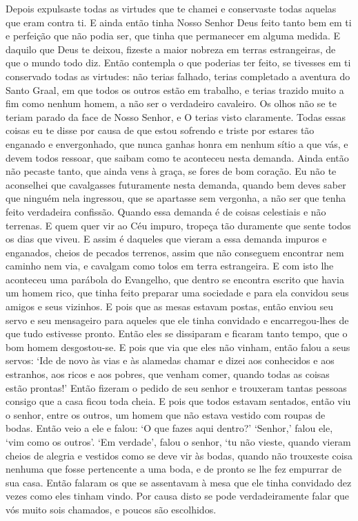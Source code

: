 Depois expulsaste todas as virtudes que te chamei e conservaste todas
aquelas que eram contra ti. E ainda então tinha Nosso Senhor Deus feito tanto
bem em ti e perfeição que não podia ser, que tinha que permanecer em alguma
medida. E daquilo que Deus te deixou, fizeste a maior nobreza em terras
estrangeiras, de que o mundo todo diz. Então contempla o que poderias ter
feito, se tivesses em ti conservado todas as virtudes: não terias falhado,
terias completado a aventura do Santo Graal, em que todos os outros estão em
trabalho, e terias trazido muito a fim como nenhum homem, a não ser o
verdadeiro cavaleiro. Os olhos não se te teriam parado da face de Nosso Senhor,
e O terias visto claramente. Todas essas coisas eu te disse por causa de que
estou sofrendo e triste por estares tão enganado e envergonhado, que nunca
ganhas honra em nenhum sítio a que vás, e devem todos ressoar, que saibam como
te aconteceu nesta demanda. Ainda então não pecaste tanto, que ainda vens à
graça, se fores de bom coração. Eu não te aconselhei que cavalgasses
futuramente nesta demanda, quando bem deves saber que ninguém nela ingressou,
que se apartasse sem vergonha, a não ser que tenha feito verdadeira confissão.
Quando essa demanda é de coisas celestiais e não terrenas. E quem quer vir ao
Céu impuro, tropeça tão duramente que sente todos os dias que viveu. E assim é
daqueles que vieram a essa demanda impuros e enganados, cheios de pecados
terrenos, assim que não conseguem encontrar nem caminho nem via, e cavalgam
como tolos em terra estrangeira. E com isto lhe aconteceu uma parábola do
Evangelho, que dentro se encontra escrito que havia um homem rico, que tinha
feito preparar uma sociedade e para ela convidou seus amigos e seus vizinhos. E
pois que as mesas estavam postas, então enviou seu servo e seu mensageiro para
aqueles que ele tinha convidado e encarregou-lhes de que tudo estivesse pronto.
Então eles se dissiparam e ficaram tanto tempo, que o bom homem desgostou-se. E
pois que via que eles não vinham, então falou a seus servos: ‘Ide de novo às
vias e às alamedas chamar e dizei aos conhecidos e aos estranhos, aos ricos e
aos pobres, que venham comer, quando todas as coisas estão prontas!’ Então
fizeram o pedido de seu senhor e trouxeram tantas pessoas consigo que a casa
ficou toda cheia. E pois que todos estavam sentados, então viu o senhor, entre
os outros, um homem que não estava vestido com roupas de bodas. Então veio a
ele e falou: ‘O que fazes aqui dentro?’ ‘Senhor,’ falou ele, ‘vim como os
outros’. ‘Em verdade’, falou o senhor, ‘tu não vieste, quando vieram cheios de
alegria e vestidos como se deve vir às bodas, quando não trouxeste coisa
nenhuma que fosse pertencente a uma boda, e de pronto se lhe fez empurrar de
sua casa. Então falaram os que se assentavam à mesa que ele tinha convidado dez
vezes como eles tinham vindo. Por causa disto se pode verdadeiramente falar que
vós muito sois chamados, e poucos são escolhidos. 

